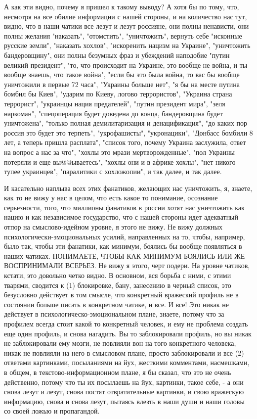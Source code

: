 А как эти видно, почему я пришел к такому выводу? А хотя бы по тому, что,
несмотря на все обилие информации с нашей стороны, и на количество нас тут,
видно, что в наши чатики все лезут и лезут россияне, они полны ненависти, они
полны желания "наказать", "отомстить", "уничтожить", вернуть себе "исконные
русские земли", "наказать хохлов", "искоренить нацизм на Украине", "уничтожить
бандеровщину", они полны безумных фраз и убеждений наподобие "путин великий
президент", "то, что происходит на Украине, это вообще не война, и ты вообще
знаешь, что такое война", "если бы это была война, то вас бы вообще уничтожили
в первые 72 часа", "Украины больше нет", "я бы на месте путина бомбил бы Киев",
"ударим по Киеву, логово террористов", "Украина страна террорист", "украинцы
нация предателей", "путин президент мира", "зеля наркоман", "спецоперация будет
доведена до конца, бандеровщина будет уничтожена", "только полная
демилитаризация и денацификация", "до каких пор россия это будет это терпеть",
"укрофашисты", "укронацики", "Донбасс бомбили 8 лет, а теперь пришла расплата",
"список того, почему Украина заслужила, ответ на вопрос а нас за что", "хохлы
это мрази мертворожденные", "пол Украины потеряли и еще вы@@ываетесь", "хохлы
они и в африке хохлы", "нет никого тупее украинцев", "паралитики с хохложопии",
и так далее, и так далее. 

И касательно наплыва всех этих фанатиков, желающих нас уничтожить, я, знаете,
как то не вижу у нас в целом, что есть какое то понимание, осознание
серьезности, того, что миллионы фанатиков в россии хотят нас уничтожить как
нацию и как независимое государство, что с нашей стороны идет адекватный отпор
на смыслово-идейном уровне, я этого не вижу. Не вижу должных
психологически-эмоциональных усилий, направленных на то, чтобы, например, было
так, чтобы эти фанатики, как минимум, боялись бы вообще появляться в наших
чатиках. ПОНИМАЕТЕ, ЧТОБЫ КАК МИНИМУМ БОЯЛИСЬ ИЛИ ЖЕ ВОСПРИНИМАЛИ ВСЕРЬЕЗ. Не
вижу я этого, черт подери.  На уровне чатиков, кстати, это довольно четко
видно. В основном, вся борьба с ними, с этими тварями, сводится к (1)
блокировке, бану, занесению в черный список, это безусловно действует в том
смысле, что конкретный вражеский профиль не в состоянии больше писать в
конкретном чатике, и все. И все!  Это никак не действует в
психологическо-эмоциональном плане, знаете, потому что за профилем всегда стоит
какой то конкретный человек, и ему не проблема создать еще один профиль, и
снова нагадить. Вы то заблокировали профиль, но вы никак не заблокировали ему
мозги, не повлияли вон на того конкретного человека, никак не повлияли на него
в смысловом плане, просто заблокировали и все (2) ответами картинками,
посыланиями на йух, жесткими комментами, насмешками, в общем, в
текстово-информационном плане, я бы сказал, что это не очень действенно, потому
что ты их посылаешь на йух, картинки, такое себе, - а они снова лезут и лезут,
снова постят отвратительные картинки, и свою вражескую информацию, снова и
снова лезут, пытаясь влезть в наши души и наши головы со своей ложью и
пропагандой.

